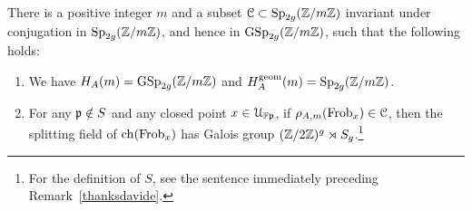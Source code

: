 	\begin{proposition}\label{proposition:good-cover}
		There is a positive integer $m$ and a subset $\mathcal C \subset \operatorname{Sp}_{2g}({\mathbb Z} / m {\mathbb Z})$ invariant under conjugation in $\operatorname{Sp}_{2g}({\mathbb Z} / m {\mathbb Z})$, and hence in $\operatorname{GSp}_{2g}({\mathbb Z} / m {\mathbb Z})$, such that the following holds:
		\begin{enumerate}
			\item We have $H_A(m) = \operatorname{GSp}_{2g}({\mathbb Z} /  m \mathbb Z)$ and $H_A^{\operatorname{geom}}(m) = \operatorname{Sp}_{2g}({\mathbb Z} /  m \mathbb Z)$.
			\item For any $\mathfrak{p} \notin S$ and any closed point $x \in \mathcal{U}_{\mathbb F\mathfrak p}$, if $\rho_{A, m}(\operatorname{Frob}_x) \in \mathcal C$, then the splitting field of $\operatorname{ch}(\operatorname{Frob}_x)$ has Galois group $({\mathbb Z}/2{\mathbb Z})^g \rtimes S_g$.\footnote{For the definition of $S$, see the sentence immediately preceding Remark~\ref{thanksdavide}.}
		\end{enumerate}
	\end{proposition}
